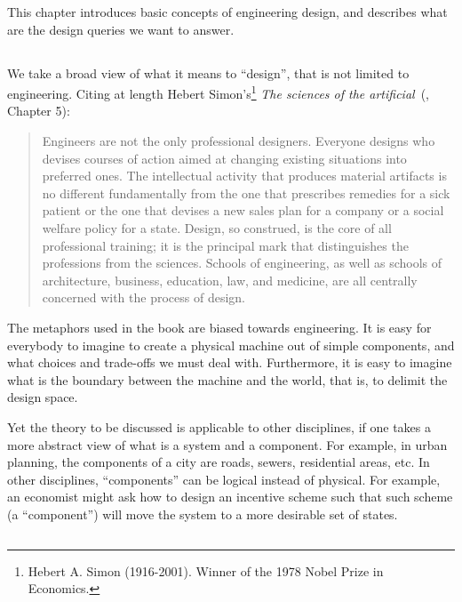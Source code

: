 This chapter introduces basic concepts of engineering design, and describes what are the design queries we want to answer.


\subsection{}

We take a broad view of what it means to ``design'', that is not limited to engineering. Citing at length 
Hebert Simon's\footnote{Hebert A. Simon (1916-2001). Winner of the 1978 Nobel Prize in Economics.}
\emph{The sciences of the artificial}~(\cite{hebert96sciences}, Chapter 5):

\begin{quote}
    Engineers are not the only professional designers. Everyone designs who devises courses of action aimed at changing existing situations into preferred ones. The intellectual activity that produces material artifacts is no different fundamentally from the one that prescribes remedies for a sick patient or the one that devises a new sales plan for a company or a social welfare policy for a state. Design, so construed, is the core of all professional training; it is the principal mark that distinguishes the professions from the sciences. Schools of engineering, as well as schools of architecture, business, education, law, and medicine, are all centrally concerned with the process of design.
\end{quote} 

The metaphors used in the book are biased towards engineering.
It is easy for everybody to imagine to create a physical machine out of simple components,
and what choices and trade-offs we must deal with. Furthermore, it is easy to imagine
what is the boundary between the machine and the world, that is, to delimit the design space.

Yet the theory to be discussed is applicable to other disciplines, if one takes a more
abstract view of what is a system and a component. For example, in urban planning, the
components of a city are roads, sewers, residential areas, etc. In other disciplines,
``components'' can be logical instead of physical. For example, an economist might ask how to
design an incentive scheme such that such scheme (a ``component'') will move the system to a more
desirable set of states.


\subsection{}

